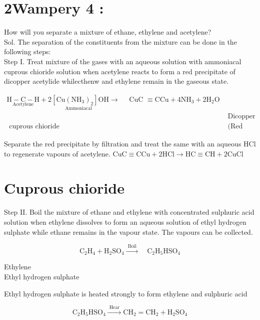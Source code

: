 \documentclass[10pt]{article}
\begin{document}
\section*{2Wampery 4 :}
How will you separate a mixture of ethane, ethylene and acetylene?\\
Sol. The separation of the constituents from the mixture can be done in the following steps:\\
Step I. Treat mixture of the gases with an aqueous solution with ammoniacal cuprous chioride solution when acetylene reacts to form a red precipitate of dicopper acetylide whilecthenw and ethylene remain in the gaseous state.

$$
\begin{array}{cc}
\underset{\text { Acetylene }}{\mathrm{H}-\mathrm{C}-\mathrm{H}}+\underset{\text { Ammoniacal }}{2\left[\mathrm{Cu}\left(\mathrm{NH}_{3}\right)_{2}\right] \mathrm{OH}} \rightarrow \quad \text { CuC } \equiv \mathrm{CCu}+4 \mathrm{NH}_{3}+2 \mathrm{H}_{2} \mathrm{O} \\
& \text { Dicopper acetylide } \\
\text { cuprous chioride } & \text { (Red ppt.) }
\end{array}
$$

Separate the red precipitate by filtration and treat the same with an aqueous HCl to regenerate vapours of acetylene. $\mathrm{CuC} \equiv \mathrm{CCu}+2 \mathrm{HCl} \longrightarrow \mathrm{HC} \equiv \mathrm{CH}+2 \mathrm{CuCl}$

\section*{Cuprous chioride}
Step II. Boil the mixture of ethane and ethylene with concentrated sulphuric acid solution when ethylene dissolves to form an aqueous solution of ethyl hydrogen sulphate while ethane remains in the vapour state. The vapours can be collected.

$$
\mathrm{C}_{2} \mathrm{H}_{4}+\mathrm{H}_{2} \mathrm{SO}_{4} \xrightarrow{\text { Boil }} \quad \mathrm{C}_{2} \mathrm{H}_{5} \mathrm{HSO}_{4}
$$

Ethylene\\
Ethyl hydrogen sulphate

Ethyl hydrogen sulphate is heated strongly to form ethylene and sulphuric acid

$$
\mathrm{C}_{2} \mathrm{H}_{5} \mathrm{HSO}_{4} \xrightarrow{\text { Hear }} \mathrm{CH}_{2}=\mathrm{CH}_{2}+\mathrm{H}_{2} \mathrm{SO}_{4}
$$
\end{document}
